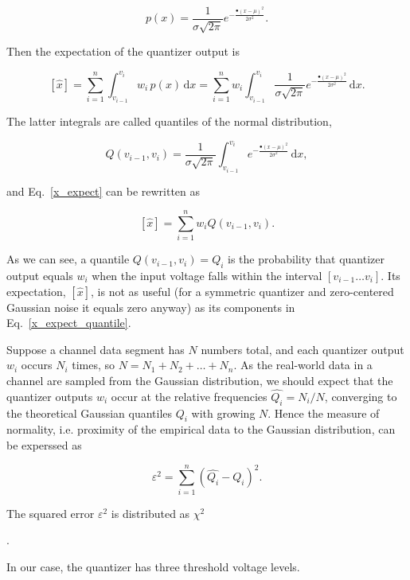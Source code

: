 \documentclass[letterpaper,twoside,12pt]{article}
\newcommand{\ud}{\mathrm d}
\begin{document}
\begin{equation}
  \label{normal_pdf}
  p(x) =  \frac{1}{\sigma\sqrt{2\pi}} e^{-\frac{•(x-\mu)^2}{2\sigma^2}}.
\end{equation}

Then the expectation of the quantizer output is

\begin{equation}
  \label{x_expect}
  [\hat{x}] = \sum_{i=1}^n \int_{v_{i-1}}^{v_i} w_i \, p(x) \, \ud x =  
  \sum_{i=1}^n w_i \int_{v_{i-1}}^{v_i} \frac{1}{\sigma\sqrt{2\pi}} e^{-\frac{•(x-\mu)^2}{2\sigma^2}} \, \ud x.
\end{equation}

The latter integrals are called quantiles of the normal distribution,

\begin{equation}
  \label{quantile}
  Q(v_{i-1}, v_i) = \frac{1}{\sigma\sqrt{2\pi}} \int_{v_{i-1}}^{v_i} e^{-\frac{•(x-\mu)^2}{2\sigma^2}} \, \ud x,
\end{equation}

and Eq.~\eqref{x_expect} can be rewritten as

\begin{equation}
  \label{x_expect_quantile}
  [\hat{x}] = \sum_{i=1}^n { w_i Q(v_{i-1}, v_i)}.
\end{equation}

As we can see, a quantile $Q(v_{i-1}, v_i) = Q_i$ is the probability that quantizer output equals $w_i$ when the input voltage falls within the interval $[v_{i-1} \ldots {v_i}]$. Its expectation, $[\hat{x}]$, is not as useful (for a symmetric quantizer and zero-centered Gaussian noise it equals zero anyway) as its components in Eq.~\eqref{x_expect_quantile}.

Suppose a channel data segment has $N$ numbers total, and each quantizer output $w_i$ occurs $N_i$ times, so $N = N_1 + N_2 + \ldots + N_n$. As the real-world data in a channel are sampled from the Gaussian distribution, we should expect that the quantizer outputs $w_i$ occur at the relative frequencies $\hat{Q_i} = N_i / N$, converging to the theoretical Gaussian quantiles $Q_i$ with growing $N$. Hence the measure of normality, i.e. proximity of the empirical data to the Gaussian distribution, can be experssed as

\begin{equation}
  \label{q_err}
  \varepsilon^2 = \sum_{i=1}^n {(\hat{Q_i} - Q_i)^2}.
\end{equation}

The squared error $\varepsilon^2$ is distributed as $\chi^2$



















.\linebreak[4] \linebreak[4] \linebreak[4]


In our case, the quantizer has three threshold voltage levels.
\end{document}

